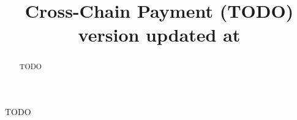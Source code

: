 \documentclass[sigconf, natbib=false]{acmart}
\begin{document}
\title{
    Cross-Chain Payment (TODO) {\normalsize \normalfont version updated at \DTMnow }
}

\begin{abstract}
TODO
\end{abstract}


\maketitle











\begin{acks}
TODO
\end{acks}

\printbibliography


\end{document}
